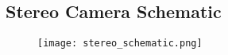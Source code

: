 \subsection{Stereo Camera Schematic}\label{stereoCameraSchematic}
\begin{figure}[H]
	\centerline{\texttt{[image: stereo\_schematic.png]}}
\end{figure}